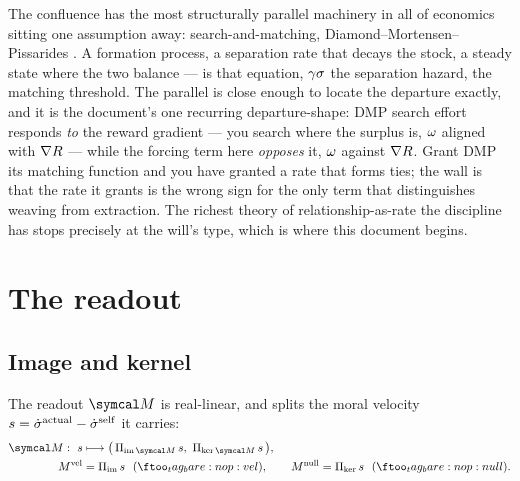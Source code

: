 \documentclass[../main]{subfiles}
\begin{document}
\begin{econ}[label=e:dmp, title={Search-and-matching, one assumption away}, ref=dyn:flow,
  cites={a:dmp}, departs=annex,
  stopsat={search effort aligns with the reward gradient; the will opposes it}]
  The confluence has the most structurally parallel machinery in all of economics sitting
  one assumption away: search-and-matching, Diamond--Mortensen--Pissarides \parencite{a:dmp}.
  A formation process, a separation rate that decays the stock, a steady state where the two
  balance ---  is that equation, $\gamma\sigma$ the separation hazard, 
  the matching threshold. The parallel is close enough to locate the departure exactly, and
  it is the document's one recurring departure-shape: DMP search effort responds \emph{to} the
  reward gradient --- you search where the surplus is, $\omega$ aligned with
  $\nabla R$ --- while the forcing term here \emph{opposes} it, $\omega$ against
  $\nabla R$. Grant DMP its matching function and you have granted a rate that
  forms ties; the wall is that the rate it grants is the wrong sign for the only term that
  distinguishes weaving from extraction. The richest theory of relationship-as-rate the
  discipline has stops precisely at the will's type, which is where this document begins.
\end{econ}

\clearpage
\section{The readout}
\label{sec:readout}

\subsection{Image and kernel}
\label{subsec:readout:image-kernel}
%
\begin{definition}
  The readout $\readout$ is real-linear, and  splits the moral velocity
  $s=\dot{\sigma}\sp{\mathrm{actual}}-\dot{\sigma}\sp{\mathrm{self}}$ it carries:
  \begin{align}
    \readout:\ \moralvel &\longmapsto
      \bigl(\,\Pi_{\mathrm{im}\,\readout}\,\moralvel,\ \Pi_{\ker\readout}\,\moralvel\,\bigr),
      \label{eq:op:M}\\
    \moralvelocity &=\Pi_{\mathrm{im}}\,\moralvel\ \ (\ftag*{op:vel}),\qquad
    \moralnull =\Pi_{\ker}\,\moralvel\ \ (\ftag*{op:null}).
      \label{eq:op:Mproj}
  \end{align}
\end{definition}
\end{document}
